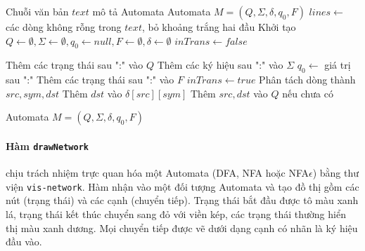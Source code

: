 \documentclass[12pt,a4paper]{report}
\begin{document}
\begin{algorithm}[H]
\caption{Phân tích Automata từ văn bản (DFA / NFA / NFA$\epsilon$)}
\begin{algorithmic}[1]
\Require Chuỗi văn bản $text$ mô tả Automata
\Ensure Automata $M = (Q, \Sigma, \delta, q_0, F)$
\State $lines \gets$ các dòng không rỗng trong $text$, bỏ khoảng trắng hai đầu
\State Khởi tạo $Q \gets \emptyset, \Sigma \gets \emptyset, q_0 \gets null, F \gets \emptyset, \delta \gets \emptyset$
\State $inTrans \gets false$

        \State Thêm các trạng thái sau ":" vào $Q$
        \State Thêm các ký hiệu sau ":" vào $\Sigma$
        \State $q_0 \gets$ giá trị sau ":"
        \State Thêm các trạng thái sau ":" vào $F$
        \State $inTrans \gets true$
        \State Phân tách dòng thành $src, sym, dst$
        \State Thêm $dst$ vào $\delta[src][sym]$
        \State Thêm $src, dst$ vào $Q$ nếu chưa có
    \EndIf
\EndFor

\State \Return Automata $M = (Q, \Sigma, \delta, q_0, F)$
\end{algorithmic}
\end{algorithm}


\hspace*{0.7cm}\paragraph{Hàm \texttt{drawNetwork}}
chịu trách nhiệm trực quan hóa một Automata (DFA, NFA hoặc NFA$\epsilon$) bằng thư viện \texttt{vis-network}. Hàm nhận vào một đối tượng Automata và tạo đồ thị gồm các nút (trạng thái) và các cạnh (chuyển tiếp). Trạng thái bắt đầu được tô màu xanh lá, trạng thái kết thúc chuyển sang đỏ với viền kép, các trạng thái thường hiển thị màu xanh dương. Mọi chuyển tiếp được vẽ dưới dạng cạnh có nhãn là ký hiệu đầu vào.
\end{document}
